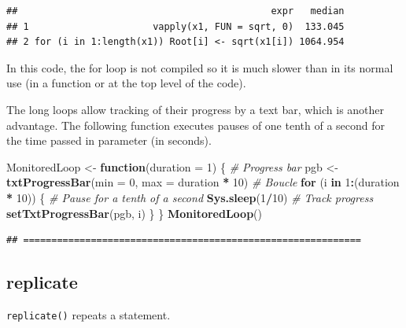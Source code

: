 \documentclass[
  12pt,
  american,
  a4paper,
  extrafontsizes,onecolumn,openright
  ]{memoir}
\newenvironment{Shaded}{\begin{snugshade}}{\end{snugshade}}
\newcommand{\AttributeTok}[1]{\textcolor[rgb]{0.13,0.29,0.53}{#1}}
\newcommand{\CommentTok}[1]{\textcolor[rgb]{0.56,0.35,0.01}{\textit{#1}}}
\newcommand{\ControlFlowTok}[1]{\textcolor[rgb]{0.13,0.29,0.53}{\textbf{#1}}}
\newcommand{\DecValTok}[1]{\textcolor[rgb]{0.00,0.00,0.81}{#1}}
\newcommand{\FunctionTok}[1]{\textcolor[rgb]{0.13,0.29,0.53}{\textbf{#1}}}
\newcommand{\NormalTok}[1]{#1}
\newcommand{\OtherTok}[1]{\textcolor[rgb]{0.56,0.35,0.01}{#1}}
\newcommand{\SpecialCharTok}[1]{\textcolor[rgb]{0.81,0.36,0.00}{\textbf{#1}}}
\begin{document}
\begin{verbatim}
##                                             expr   median
## 1                      vapply(x1, FUN = sqrt, 0)  133.045
## 2 for (i in 1:length(x1)) Root[i] <- sqrt(x1[i]) 1064.954
\end{verbatim}

\normalsize

In this code, the for loop is not compiled so it is much slower than in its normal use (in a function or at the top level of the code).

The long loops allow tracking of their progress by a text bar, which is another advantage.
The following function executes pauses of one tenth of a second for the time passed in parameter (in seconds).

\scriptsize

\begin{Shaded}
\begin{Highlighting}[]
\NormalTok{MonitoredLoop }\OtherTok{\textless{}{-}} \ControlFlowTok{function}\NormalTok{(}\AttributeTok{duration =} \DecValTok{1}\NormalTok{) \{}
    \CommentTok{\# Progress bar}
\NormalTok{    pgb }\OtherTok{\textless{}{-}} \FunctionTok{txtProgressBar}\NormalTok{(}\AttributeTok{min =} \DecValTok{0}\NormalTok{, }\AttributeTok{max =}\NormalTok{ duration }\SpecialCharTok{*} \DecValTok{10}\NormalTok{)}
    \CommentTok{\# Boucle}
    \ControlFlowTok{for}\NormalTok{ (i }\ControlFlowTok{in} \DecValTok{1}\SpecialCharTok{:}\NormalTok{(duration }\SpecialCharTok{*} \DecValTok{10}\NormalTok{)) \{}
        \CommentTok{\# Pause for a tenth of a second}
        \FunctionTok{Sys.sleep}\NormalTok{(}\DecValTok{1}\SpecialCharTok{/}\DecValTok{10}\NormalTok{)}
        \CommentTok{\# Track progress}
        \FunctionTok{setTxtProgressBar}\NormalTok{(pgb, i)}
\NormalTok{    \}}
\NormalTok{\}}
\FunctionTok{MonitoredLoop}\NormalTok{()}
\end{Highlighting}
\end{Shaded}

\begin{verbatim}
## ============================================================
\end{verbatim}

\normalsize

\subsection{replicate}\label{replicate}

\texttt{replicate()} repeats a statement.
\end{document}
